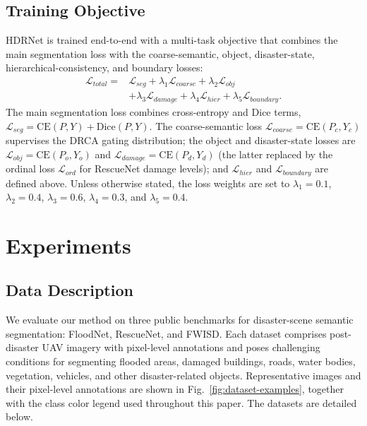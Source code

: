 \documentclass[lettersize,journal]{IEEEtran}
\begin{document}
\subsection{Training Objective}
HDRNet is trained end-to-end with a multi-task objective that combines the main segmentation loss with the coarse-semantic, object, disaster-state, hierarchical-consistency, and boundary losses:
\begin{equation}
\begin{split}
\mathcal{L}_{total} = {}& \mathcal{L}_{seg} + \lambda_1\mathcal{L}_{coarse} + \lambda_2\mathcal{L}_{obj} \\
&+ \lambda_3\mathcal{L}_{damage} + \lambda_4\mathcal{L}_{hier} + \lambda_5\mathcal{L}_{boundary}.
\end{split}
\end{equation}
The main segmentation loss combines cross-entropy and Dice terms, $\mathcal{L}_{seg}=\mathrm{CE}(P,Y)+\mathrm{Dice}(P,Y)$. The coarse-semantic loss $\mathcal{L}_{coarse}=\mathrm{CE}(P_c,Y_c)$ supervises the DRCA gating distribution; the object and disaster-state losses are $\mathcal{L}_{obj}=\mathrm{CE}(P_o,Y_o)$ and $\mathcal{L}_{damage}=\mathrm{CE}(P_d,Y_d)$ (the latter replaced by the ordinal loss $\mathcal{L}_{ord}$ for RescueNet damage levels); and $\mathcal{L}_{hier}$ and $\mathcal{L}_{boundary}$ are defined above. Unless otherwise stated, the loss weights are set to $\lambda_1=0.1$, $\lambda_2=0.4$, $\lambda_3=0.6$, $\lambda_4=0.3$, and $\lambda_5=0.4$.

\section{Experiments}
\subsection{Data Description}
We evaluate our method on three public benchmarks for disaster-scene semantic segmentation: FloodNet\cite{rahnemoonfarFloodnetHighResolution2021a}, RescueNet\cite{rahnemoonfarRescueNetHighResolution2023a}, and FWISD\cite{xueFWISDFloodWaterfront2026a}. Each dataset comprises post-disaster UAV imagery with pixel-level annotations and poses challenging conditions for segmenting flooded areas, damaged buildings, roads, water bodies, vegetation, vehicles, and other disaster-related objects. Representative images and their pixel-level annotations are shown in Fig.~\ref{fig:dataset-examples}, together with the class color legend used throughout this paper. The datasets are detailed below.
\end{document}
